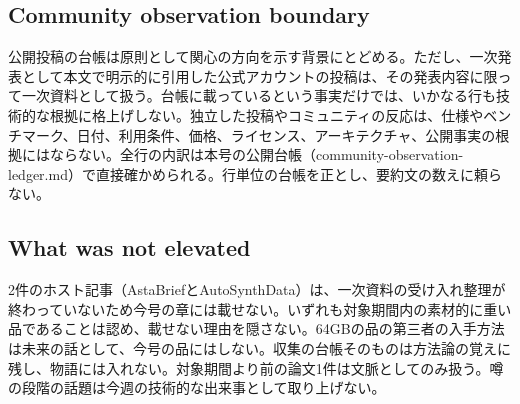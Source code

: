 \subsection*{Community observation boundary}
公開投稿の台帳は原則として関心の方向を示す背景にとどめる。ただし、一次発表として本文で明示的に引用した公式アカウントの投稿は、その発表内容に限って一次資料として扱う。台帳に載っているという事実だけでは、いかなる行も技術的な根拠に格上げしない。独立した投稿やコミュニティの反応は、仕様やベンチマーク、日付、利用条件、価格、ライセンス、アーキテクチャ、公開事実の根拠にはならない。全行の内訳は本号の公開台帳（community-observation-ledger.md）で直接確かめられる。行単位の台帳を正とし、要約文の数えに頼らない。

\subsection*{What was not elevated}
2件のホスト記事（AstaBriefとAutoSynthData）は、一次資料の受け入れ整理が終わっていないため今号の章には載せない。いずれも対象期間内の素材的に重い品であることは認め、載せない理由を隠さない。64GBの品の第三者の入手方法は未来の話として、今号の品にはしない。収集の台帳そのものは方法論の覚えに残し、物語には入れない。対象期間より前の論文1件は文脈としてのみ扱う。噂の段階の話題は今週の技術的な出来事として取り上げない。

